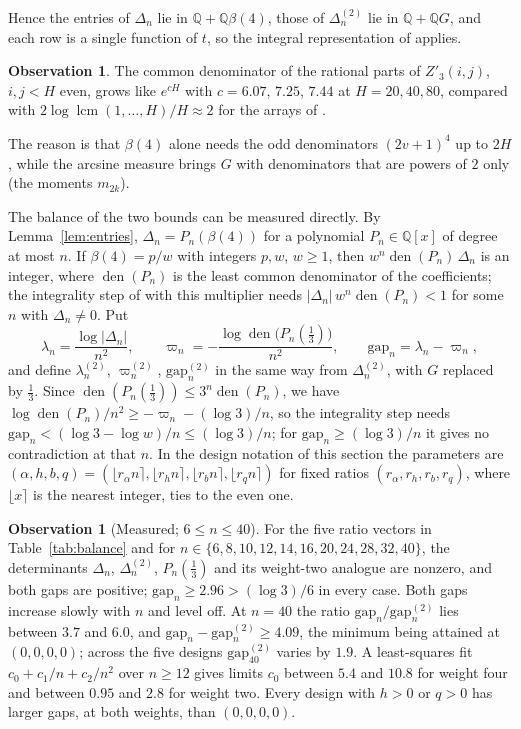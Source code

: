 \documentclass[11pt]{article}
\theoremstyle{definition}
\newtheorem{observation}[theorem]{Observation}
\begin{document}
Hence the entries of $\Delta_n$ lie in $\mathbb Q+\mathbb Q\beta(4)$, those of $\Delta^{(2)}_n$ lie in $\mathbb Q+\mathbb QG$, and each row is a single function of $t$, so the integral representation of \cite[Sec.~5]{OAI} applies.

\begin{observation}\label{obs:halfint}
The common denominator of the rational parts of $Z'_3(i,j)$, $i,j<H$ even, grows like $e^{cH}$ with $c=6.07$, $7.25$, $7.44$ at $H=20,40,80$, compared with $2\log\operatorname{lcm}(1,\dots,H)/H\approx2$ for the arrays of \cite{OAI}.
\end{observation}

The reason is that $\beta(4)$ alone needs the odd denominators $(2v+1)^4$ up to $2H$, while the arcsine measure brings $G$ with denominators that are powers of $2$ only (the moments $m_{2k}$).

The balance of the two bounds can be measured directly. By Lemma~\ref{lem:entries}, $\Delta_n=P_n(\beta(4))$ for a polynomial $P_n\in\mathbb Q[x]$ of degree at most $n$. If $\beta(4)=p/w$ with integers $p,w$, $w\ge1$, then $w^n\operatorname{den}(P_n)\,\Delta_n$ is an integer, where $\operatorname{den}(P_n)$ is the least common denominator of the coefficients; the integrality step of \cite{OAI} with this multiplier needs $|\Delta_n|\,w^n\operatorname{den}(P_n)<1$ for some $n$ with $\Delta_n\ne0$. Put
\[
\lambda_n=\frac{\log|\Delta_n|}{n^2},\qquad \varpi_n=-\frac{\log\operatorname{den}\big(P_n(\tfrac13)\big)}{n^2},\qquad \text{gap}_n=\lambda_n-\varpi_n,
\]
and define $\lambda^{(2)}_n$, $\varpi^{(2)}_n$, $\text{gap}^{(2)}_n$ in the same way from $\Delta^{(2)}_n$, with $G$ replaced by $\frac13$. Since $\operatorname{den}(P_n(\frac13))\le3^n\operatorname{den}(P_n)$, we have $\log\operatorname{den}(P_n)/n^2\ge-\varpi_n-(\log3)/n$, so the integrality step needs $\text{gap}_n<(\log3-\log w)/n\le(\log3)/n$; for $\text{gap}_n\ge(\log3)/n$ it gives no contradiction at that $n$. In the design notation of this section the parameters are $(\alpha,h,b,q)=(\lfloor r_\alpha n\rceil,\lfloor r_hn\rceil,\lfloor r_bn\rceil,\lfloor r_qn\rceil)$ for fixed ratios $(r_\alpha,r_h,r_b,r_q)$, where $\lfloor x\rceil$ is the nearest integer, ties to the even one.

\begin{observation}[Measured; $6\le n\le40$]\label{obs:balance}
For the five ratio vectors in Table~\ref{tab:balance} and for $n\in\{6,8,10,12,14,16,\allowbreak20,24,28,32,40\}$, the determinants $\Delta_n$, $\Delta^{(2)}_n$, $P_n(\frac13)$ and its weight-two analogue are nonzero, and both gaps are positive; $\text{gap}_n\ge2.96>(\log3)/6$ in every case. Both gaps increase slowly with $n$ and level off. At $n=40$ the ratio $\text{gap}_n/\text{gap}^{(2)}_n$ lies between $3.7$ and $6.0$, and $\text{gap}_n-\text{gap}^{(2)}_n\ge4.09$, the minimum being attained at $(0,0,0,0)$; across the five designs $\text{gap}^{(2)}_{40}$ varies by $1.9$. A least-squares fit $c_0+c_1/n+c_2/n^2$ over $n\ge12$ gives limits $c_0$ between $5.4$ and $10.8$ for weight four and between $0.95$ and $2.8$ for weight two. Every design with $h>0$ or $q>0$ has larger gaps, at both weights, than $(0,0,0,0)$.
\end{observation}
\end{document}
